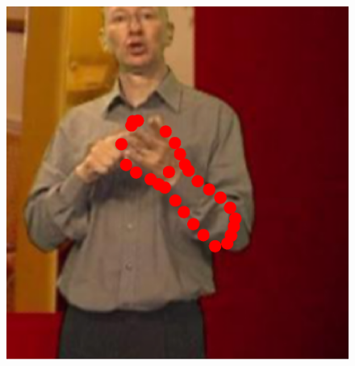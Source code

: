 \begin{figure}
    \includegraphics[height=\ofh]{resources/Annotation_Correction/Suplementory_Meterial/ExFit/0011.eps}
    \hfill

\end{figure}
